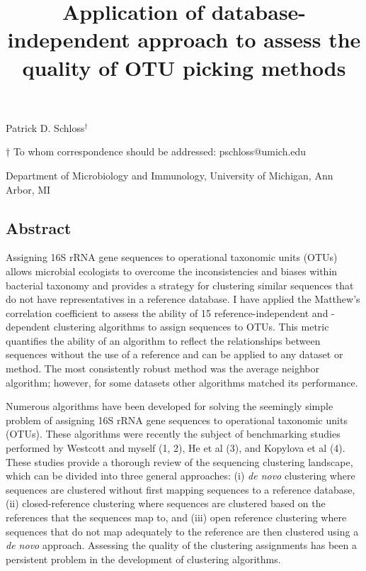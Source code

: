 \documentclass[11pt,]{article}
\title{\textbf{Application of database-independent approach to assess the
quality of OTU picking methods}}
\author{}
\date{}
\begin{document}
\maketitle

\begin{center}
\vspace{25mm}
Patrick D. Schloss${^\dagger}$

\vspace{30mm}

$\dagger$ To whom correspondence should be addressed: pschloss@umich.edu

Department of Microbiology and Immunology, University of Michigan, Ann Arbor, MI
\end{center}

\newpage

\linenumbers

\subsection{Abstract}\label{abstract}

Assigning 16S rRNA gene sequences to operational taxonomic units (OTUs)
allows microbial ecologists to overcome the inconsistencies and biases
within bacterial taxonomy and provides a strategy for clustering similar
sequences that do not have representatives in a reference database. I
have applied the Matthew's correlation coefficient to assess the ability
of 15 reference-independent and -dependent clustering algorithms to
assign sequences to OTUs. This metric quantifies the ability of an
algorithm to reflect the relationships between sequences without the use
of a reference and can be applied to any dataset or method. The most
consistently robust method was the average neighbor algorithm; however,
for some datasets other algorithms matched its performance.

\newpage

Numerous algorithms have been developed for solving the seemingly simple
problem of assigning 16S rRNA gene sequences to operational taxonomic
units (OTUs). These algorithms were recently the subject of benchmarking
studies performed by Westcott and myself (1, 2), He et al (3), and
Kopylova et al (4). These studies provide a thorough review of the
sequencing clustering landscape, which can be divided into three general
approaches: (i) \emph{de novo} clustering where sequences are clustered
without first mapping sequences to a reference database, (ii)
closed-reference clustering where sequences are clustered based on the
references that the sequences map to, and (iii) open reference
clustering where sequences that do not map adequately to the reference
are then clustered using a \emph{de novo} approach. Assessing the
quality of the clustering assignments has been a persistent problem in
the development of clustering algorithms.
\end{document}
